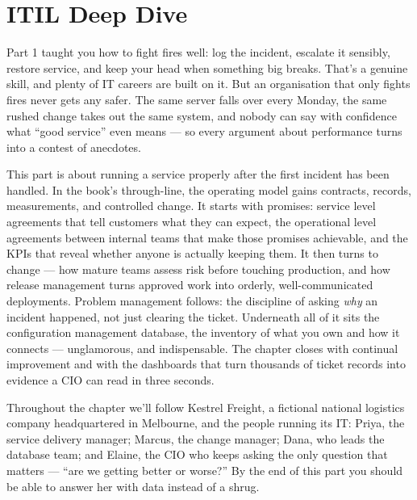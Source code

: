 
\chapter{ITIL Deep Dive}


Part 1 taught you how to fight fires well: log the incident, escalate it sensibly, restore service, and keep your head when something big breaks. That's a genuine skill, and plenty of IT careers are built on it. But an organisation that only fights fires never gets any safer. The same server falls over every Monday, the same rushed change takes out the same system, and nobody can say with confidence what ``good service'' even means — so every argument about performance turns into a contest of anecdotes.


This part is about running a service properly after the first incident has been handled. In the book's through-line, the operating model gains contracts, records, measurements, and controlled change. It starts with promises: service level agreements that tell customers what they can expect, the operational level agreements between internal teams that make those promises achievable, and the KPIs that reveal whether anyone is actually keeping them. It then turns to change — how mature teams assess risk before touching production, and how release management turns approved work into orderly, well-communicated deployments. Problem management follows: the discipline of asking \emph{why} an incident happened, not just clearing the ticket. Underneath all of it sits the configuration management database, the inventory of what you own and how it connects — unglamorous, and indispensable. The chapter closes with continual improvement and with the dashboards that turn thousands of ticket records into evidence a CIO can read in three seconds.


Throughout the chapter we'll follow Kestrel Freight, a fictional national logistics company headquartered in Melbourne, and the people running its IT: Priya, the service delivery manager; Marcus, the change manager; Dana, who leads the database team; and Elaine, the CIO who keeps asking the only question that matters — ``are we getting better or worse?'' By the end of this part you should be able to answer her with data instead of a shrug.

